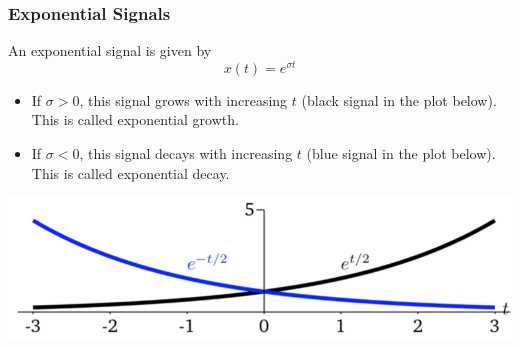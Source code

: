 \documentclass[10pt]{article}
\begin{document}
\subsubsection*{Exponential Signals}
An exponential signal is given by
\[x(t) = e^{\sigma t}\]
\begin{itemize}
    \item If $\sigma > 0$, this signal grows with increasing $t$ (black signal in the plot below).  This is called exponential growth.
    \item If $\sigma < 0$, this signal decays with increasing $t$ (blue signal in the plot below).  This is called exponential decay.
\end{itemize}
\begin{center}
    \includegraphics[scale=0.6]{W1_7.png}
\end{center}
\end{document}
